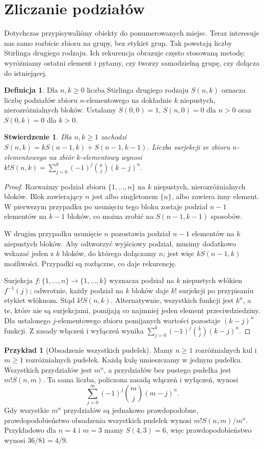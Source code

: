 \documentclass[11pt,a4paper,oneside]{report}
\numberwithin{equation}{chapter}
\theoremstyle{plain}
\newtheorem{stwierdzenie}[twierdzenie]{Stwierdzenie}
\theoremstyle{definition}
\newtheorem{definicja}{Definicja}[chapter]
\newtheorem{przyklad}{Przykład}[chapter]
\theoremstyle{remark}
\begin{document}
\section{Zliczanie podziałów}
Dotychczas przypisywaliśmy obiekty do ponumerowanych miejsc.
Teraz interesuje nas samo rozbicie zbioru na grupy, bez etykiet
grup. Tak powstają liczby Stirlinga drugiego rodzaju. Ich
rekurencja obrazuje często stosowaną metodę: wyróżniamy ostatni
element i pytamy, czy tworzy samodzielną grupę, czy dołącza
do istniejącej.

\begin{definicja}
Dla $n,k\geq0$ liczba Stirlinga drugiego rodzaju $S(n,k)$ oznacza
liczbę podziałów zbioru $n$-elementowego na dokładnie $k$
niepustych, nierozróżnialnych bloków. Ustalamy $S(0,0)=1$,
$S(n,0)=0$ dla $n>0$ oraz $S(0,k)=0$ dla $k>0$.
\end{definicja}
\begin{stwierdzenie}
Dla $n,k\geq1$ zachodzi
$S(n,k)=kS(n-1,k)+S(n-1,k-1)$.
Liczba surjekcji ze zbioru $n$-elementowego na zbiór $k$-elementowy
wynosi $k!S(n,k)=\sum_{j=0}^k(-1)^j\binom kj(k-j)^n$.
\end{stwierdzenie}
\begin{proof}
Rozważmy podział zbioru $\{1,\ldots,n\}$ na $k$
niepustych, nierozróżnialnych bloków. Blok zawierający
$n$ jest albo singletonem $\{n\}$, albo zawiera inny
element. W pierwszym przypadku po usunięciu tego bloku
zostaje podział $n-1$ elementów na $k-1$ bloków,
co można zrobić na $S(n-1,k-1)$ sposobów.

W drugim przypadku usunięcie $n$ pozostawia podział
$n-1$ elementów na $k$ niepustych bloków. Aby odtworzyć
wyjściowy podział, musimy dodatkowo wskazać jeden z $k$
bloków, do którego dołączamy $n$; jest więc
$kS(n-1,k)$ możliwości. Przypadki są rozłączne,
co daje rekurencję.

Surjekcja $f:\{1,\ldots,n\}\to\{1,\ldots,k\}$
wyznacza podział na $k$ niepustych włókien
$f^{-1}(j)$; odwrotnie, każdy podział na $k$ bloków
daje $k!$ surjekcji po przypisaniu etykiet włóknom.
Stąd $k!S(n,k)$. Alternatywnie, wszystkich funkcji jest
$k^n$, a te, które nie są surjekcjami, pomijają co najmniej
jeden element przeciwdziedziny. Dla ustalonego
$j$-elementowego zbioru pomijanych wartości pozostaje
$(k-j)^n$ funkcji. Z zasady włączeń i wyłączeń wynika
$\sum_{j=0}^k(-1)^j\binom kj(k-j)^n$.
\end{proof}

\begin{przyklad}[Obsadzenie wszystkich pudełek]
Mamy $n\geq1$ rozróżnialnych kul i $m\geq1$ rozróżnialnych pudełek.
Każdą kulę umieszczamy w jednym pudełku. Wszystkich przydziałów
jest $m^n$, a przydziałów bez pustego pudełka jest $m!S(n,m)$.
Ta sama liczba, policzona zasadą włączeń i wyłączeń, wynosi
\[
\sum_{j=0}^{m}(-1)^j\binom mj(m-j)^n.
\]
Gdy wszystkie $m^n$ przydziałów są jednakowo prawdopodobne,
prawdopodobieństwo obsadzenia wszystkich pudełek wynosi
$m!S(n,m)/m^n$. Przykładowo dla $n=4$ i $m=3$
mamy $S(4,3)=6$, więc prawdopodobieństwo wynosi $36/81=4/9$.
\end{przyklad}
\end{document}
